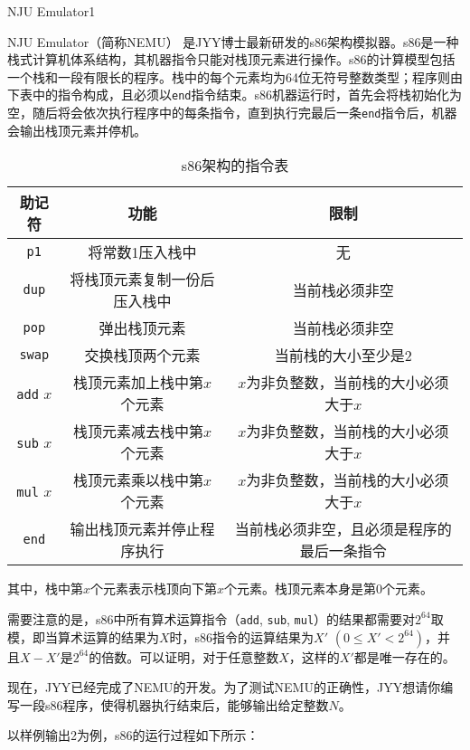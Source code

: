 \begin{Problem}{NJU Emulator}{1}

NJU Emulator（简称NEMU） 是JYY博士最新研发的s86架构模拟器。s86是一种栈式计算机体系结构，其机器指令只能对栈顶元素进行操作。s86的计算模型包括一个栈和一段有限长的程序。栈中的每个元素均为64位无符号整数类型；程序则由下表中的指令构成，且必须以\texttt{end}指令结束。s86机器运行时，首先会将栈初始化为空，随后将会依次执行程序中的每条指令，直到执行完最后一条\texttt{end}指令后，机器会输出栈顶元素并停机。

\begin{table}[htbp]
\centering
\begin{tabular}{ccc}
\hline
助记符 & 功能 & 限制  \\ \hline
\texttt{p1} & 将常数1压入栈中 & 无 \\ 
\texttt{dup} & 将栈顶元素复制一份后压入栈中 & 当前栈必须非空 \\
\texttt{pop} & 弹出栈顶元素 & 当前栈必须非空 \\
\texttt{swap} & 交换栈顶两个元素 & 当前栈的大小至少是2 \\ 
\texttt{add} $x$ & 栈顶元素加上栈中第$x$个元素 & $x$为非负整数，当前栈的大小必须大于$x$ \\ 
\texttt{sub} $x$ & 栈顶元素减去栈中第$x$个元素 & $x$为非负整数，当前栈的大小必须大于$x$ \\
\texttt{mul} $x$ & 栈顶元素乘以栈中第$x$个元素 & $x$为非负整数，当前栈的大小必须大于$x$ \\
\texttt{end} & 输出栈顶元素并停止程序执行 & 当前栈必须非空，且必须是程序的最后一条指令 \\ \hline
\end{tabular}
\caption{s86架构的指令表}
\end{table}

其中，栈中第$x$个元素表示栈顶向下第$x$个元素。栈顶元素本身是第0个元素。

需要注意的是，s86中所有算术运算指令（\texttt{add}, \texttt{sub}, \texttt{mul}）的结果都需要对$2^{64}$取模，即当算术运算的结果为$X$时，s86指令的运算结果为$X'$ $(0 \leq X' < 2^{64})$，并且$X - X'$是$2^{64}$的倍数。可以证明，对于任意整数$X$，这样的$X'$都是唯一存在的。

现在，JYY已经完成了NEMU的开发。为了测试NEMU的正确性，JYY想请你编写一段s86程序，使得机器执行结束后，能够输出给定整数$N$。

以样例输出2为例，s86的运行过程如下所示：


\end{Problem}
